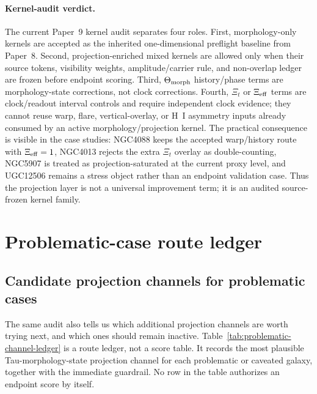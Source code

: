 \documentclass[11pt]{article}
\begin{document}
\paragraph{Kernel-audit verdict.}
The current Paper~9 kernel audit separates four roles.  First,
morphology-only kernels are accepted as the inherited one-dimensional preflight
baseline from Paper~8.  Second, projection-enriched mixed kernels are allowed
only when their source tokens, visibility weights, amplitude/carrier rule, and
non-overlap ledger are frozen before endpoint scoring.  Third, \(\Theta_{\rm
morph}\) history/phase terms are morphology-state corrections, not clock
corrections.  Fourth, \(\Xi_t\) or \(\Xi_{\rm eff}\) terms are clock/readout
interval controls and require independent clock evidence; they cannot reuse
warp, flare, vertical-overlay, or H~I asymmetry inputs already consumed by an
active morphology/projection kernel.  The practical consequence is visible in
the case studies: NGC4088 keeps the accepted warp/history route with
\(\Xi_{\rm eff}=1\), NGC4013 rejects the extra \(\Xi_t\) overlay as
double-counting, NGC5907 is treated as projection-saturated at the current
proxy level, and UGC12506 remains a stress object rather than an endpoint
validation case.  Thus the projection layer is not a universal improvement
term; it is an audited source-frozen kernel family.

\section{Problematic-case route ledger}
\label{sec:problematic-ledger}

\subsection{Candidate projection channels for problematic cases}

The same audit also tells us which additional projection channels are worth
trying next, and which ones should remain inactive.  Table~\ref{tab:problematic-channel-ledger}
is a route ledger, not a score table.  It records the most plausible
Tau-morphology-state projection channel for each problematic or caveated
galaxy, together with the immediate guardrail.  No row in the table authorizes
an endpoint score by itself.
\end{document}
